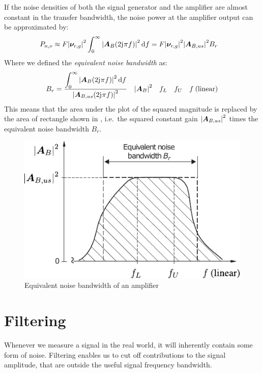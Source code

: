 If the noise densities of both the signal generator and the amplifier are almost constant in the transfer bandwidth, the noise power at the amplifier output can be approximated by:
\begin{align}
  P_{n,o} &\approx F\abs{\bm{\nu}_{r,g}}^2\int_0^\infty \abs{\bm{A}_B(2\mathrm{j}\mkern1mu\pi f)}^2\dd{f} = F\abs{\bm{\nu}_{r,g}}^2\abs{\bm{A}_{B,us}}^2 B_r
\end{align}
Where we defined the \emph{equivalent noise bandwidth} as:
\begin{align}
  B_r = \frac{\displaystyle\int_0^\infty \abs{\bm{A}_B(2\mathrm{j}\mkern1mu\pi f)}^2\dd{f}}{\abs{\bm{A}_{B,us}(2\mathrm{j}\mkern1mu\pi f)}^2} \quad\abs{\bm{A}_B}^2\quad f_L\quad f_U \quad f\:\text{(linear)}
\end{align}
This means that the area under the plot of the squared magnitude is replaced by the area of rectangle shown in , i.e.\ the squared constant gain $\abs{\bm{A}_{B,us}}^2$ times the equivalent noise bandwidth $B_r$.

\begin{figure}[htb!]
  \centering
  \includegraphics[scale=1]{figures/electronics/op_amp/equivalent_noise_bandwidth}
  \caption[Equivalent Noise Bandwidth of an Amplifier]{Equivalent noise bandwidth of an amplifier \cite{Tietze2008EC}%
    \label{fig:equivalent_noise_bandwidth}}
\end{figure}

\section{Filtering}
Whenever we measure a signal in the real world, it will inherently contain some form of noise. Filtering enables us to cut off contributions to the signal amplitude, that are outside the useful signal frequency bandwidth.

